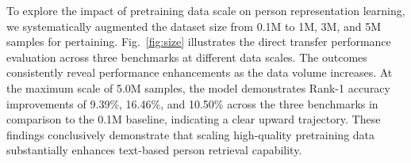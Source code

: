 To explore the impact of pretraining data scale on person representation learning, we systematically augmented the dataset size from 0.1M to 1M, 3M, and 5M samples for pertaining. Fig.~\ref{fig:size} illustrates the direct transfer performance evaluation across three benchmarks at different data scales. The outcomes consistently reveal performance enhancements as the data volume increases. At the maximum scale of 5.0M samples, the model demonstrates Rank-1 accuracy improvements of 9.39\%, 16.46\%, and 10.50\% across the three benchmarks in comparison to the 0.1M baseline, indicating a clear upward trajectory. These findings conclusively demonstrate that scaling high-quality pretraining data substantially enhances text-based person retrieval capability.


